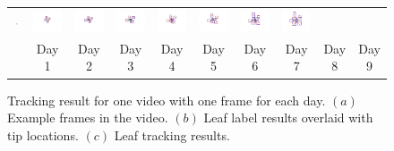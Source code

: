 \begin{figure}
\begin{centering}
\begin{tabular}{c c@{} c@{} c@{} c@{} c@{} c@{} c@{} c@{} c@{}}
\includegraphics[trim= 100 70 120 10, clip, width=.1\textwidth]{Figures/trackExample/3_2.pdf}&
\includegraphics[trim= 100 70 120 10, clip, width=.1\textwidth]{Figures/trackExample/3_3.pdf}&
\includegraphics[trim= 100 70 120 10, clip, width=.1\textwidth]{Figures/trackExample/3_4.pdf}&
\includegraphics[trim= 100 70 120 10, clip, width=.1\textwidth]{Figures/trackExample/3_5.pdf}&
\includegraphics[trim= 100 70 120 10, clip, width=.1\textwidth]{Figures/trackExample/3_6.pdf}&
\includegraphics[trim= 100 70 120 10, clip, width=.1\textwidth]{Figures/trackExample/3_7.pdf}&
\includegraphics[trim= 100 70 120 10, clip, width=.1\textwidth]{Figures/trackExample/3_8.pdf}&
\includegraphics[trim= 100 70 120 10, clip, width=.1\textwidth]{Figures/trackExample/3_9.pdf}\\

& Day 1 & Day 2 & Day 3 & Day 4 & Day 5 & Day 6 & Day 7 & Day 8 & Day 9 \\
\end{tabular}
\caption{Tracking result for one video with one frame for each day. $(a)$ Example frames in the video. $(b)$ Leaf label results overlaid with tip locations. $(c)$ Leaf tracking results. }
\label{fig:trackExample}
\end{centering}
\end{figure}


